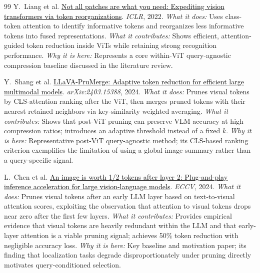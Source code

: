 \documentclass[11pt,twocolumn]{article}
\newcommand{\paperhref}[2]{\href{#1}{\textcolor{black}{#2}}}
\begin{document}
\begin{thebibliography}{99}
Y.~Liang et al.
\newblock \paperhref{https://arxiv.org/abs/2202.07800}{Not all patches are what you need: Expediting vision transformers via token reorganizations}.
\newblock \textit{ICLR}, 2022.
\newblock \textit{What it does:} Uses class-token attention to identify informative tokens and reorganizes less informative tokens into fused representations.
\newblock \textit{What it contributes:} Shows efficient, attention-guided token reduction inside ViTs while retaining strong recognition performance.
\newblock \textit{Why it is here:} Represents a core within-ViT query-agnostic compression baseline discussed in the literature review.

Y.~Shang et al.
\newblock \paperhref{https://arxiv.org/abs/2403.15388}{LLaVA-PruMerge: Adaptive token reduction for efficient large multimodal models}.
\newblock \textit{arXiv:2403.15388}, 2024.
\newblock \textit{What it does:} Prunes visual tokens by CLS-attention ranking after the ViT, then merges pruned tokens with their nearest retained neighbors via key-similarity weighted averaging.
\newblock \textit{What it contributes:} Shows that post-ViT pruning can preserve VLM accuracy at high compression ratios; introduces an adaptive threshold instead of a fixed $k$.
\newblock \textit{Why it is here:} Representative post-ViT query-agnostic method; its CLS-based ranking criterion exemplifies the limitation of using a global image summary rather than a query-specific signal.

L.~Chen et al.
\newblock \paperhref{https://arxiv.org/abs/2410.04417}{An image is worth 1/2 tokens after layer 2: Plug-and-play inference acceleration for large vision-language models}.
\newblock \textit{ECCV}, 2024.
\newblock \textit{What it does:} Prunes visual tokens after an early LLM layer based on text-to-visual attention scores, exploiting the observation that attention to visual tokens drops near zero after the first few layers.
\newblock \textit{What it contributes:} Provides empirical evidence that visual tokens are heavily redundant within the LLM and that early-layer attention is a viable pruning signal; achieves 50\% token reduction with negligible accuracy loss.
\newblock \textit{Why it is here:} Key baseline and motivation paper; its finding that localization tasks degrade disproportionately under pruning directly motivates query-conditioned selection.


\end{thebibliography}
\end{document}
